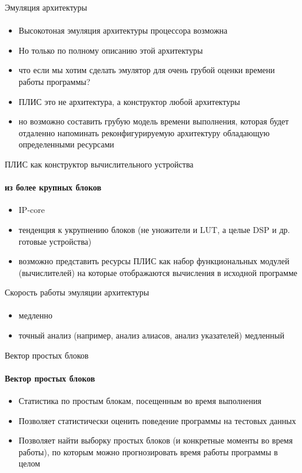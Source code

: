 \documentclass{beamer}              %
\begin{document}
\begin{frame}{Эмуляция архитектуры}
  \framesubtitle{}
  
  \begin{itemize}
      \item Высокотоная эмуляция архитектуры процессора возможна
      \item Но только по полному описанию этой архитектуры
      \item что если мы хотим сделать эмулятор для очень грубой оценки времени работы программы?
      \item ПЛИС это не архитектура, а конструктор любой архитектуры
      \item но возможно составить грубую модель времени выполнения, которая будет отдаленно напоминать реконфигурируемую архитектуру обладающую определенными ресурсами
  \end{itemize}
  
\end{frame}

\begin{frame}{ПЛИС как конструктор вычислительного устройства}
  \framesubtitle{из более крупных блоков}
  
  \begin{itemize}
      \item IP-core
      \item тенденция к укрупнению блоков (не уножители и LUT, а целые DSP и др. готовые устройства) 
      \item возможно представить ресурсы ПЛИС как набор функциональных модулей (вычислителей) на которые отображаются вычисления в исходной программе
 \end{itemize}
  
\end{frame}

\begin{frame}{Скорость работы эмуляции архитектуры}
  \framesubtitle{}
  
  \begin{itemize}
      \item медленно
      \item точный анализ (например, анализ алиасов, анализ указателей) медленный
  \end{itemize}

\end{frame}

\begin{frame}{Вектор простых блоков}
  \framesubtitle{Вектор простых блоков}
  
  \begin{itemize}
      \item Статистика по простым блокам, посещенным во время выполнения
      \item Позволяет статистически оценить поведение программы на тестовых данных
      \item Позволяет найти выборку простых блоков (и конкретные моменты во время работы), по которым можно прогнозировать время работы программы в целом
  \end{itemize}
  
\end{frame}
\end{document}
